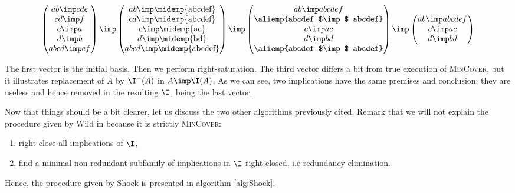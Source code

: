 \[
\begin{pmatrix}
ab  \imp  cde  \\
cd  \imp   f    \\
c  \imp  a     \\
d  \imp  b     \\
abcd \imp ef \\
\end{pmatrix}
\imp
\begin{pmatrix}
ab \imp \text{\midemp{abcdef}}   \\
cd \imp \text{\midemp{abcdef}}   \\
c \imp \text{\midemp{ac}}        \\
d \imp \text{\midemp{bd}}        \\
abcd \imp \text{\midemp{abcdef}} \\
\end{pmatrix}
\imp
\begin{pmatrix}
ab \imp abcdef \\
\text{\aliemp{abcdef $\imp$ abcdef}} \\
c \imp ac \\
d \imp bd \\
\text{\aliemp{abcdef $\imp$ abcdef}} \\
\end{pmatrix}
\imp
\begin{pmatrix}
ab \imp abcdef \\
c \imp ac \\
d \imp bd \\
\end{pmatrix}
\]

The first vector is the initial basis. Then we perform right-saturation. The
third vector differs a bit from true execution of \textsc{MinCover}, but it
illustrates replacement of $A$ by $\I^{-}(A)$ in $A \imp \I(A)$. As we can see,
two implications have the same premises and conclusion: they are useless and
hence removed in the resulting $\I$, being the last vector.

\vspace{1.2em}

Now that things should be a bit clearer, let us discuss the two other 
algorithms previously cited. Remark that we will not explain the procedure
given by Wild in \cite{wild_implicational_1989, wild_theory_1994} because it
is strictly \textsc{MinCover}:
\begin{enumerate}
	\item right-close all implications of $\I$,
	\item find a minimal non-redundant subfamily of implications in $\I$
	right-closed, i.e redundancy elimination. 
\end{enumerate}
\noindent Hence, the procedure given by Shock is presented in algorithm 
\ref{alg:Shock}.


